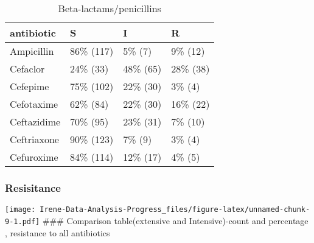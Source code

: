 \documentclass[
]{article}
\begin{document}
\begin{table}

\caption{\label{tab:unnamed-chunk-8}
Beta-lactams/penicillins}
\centering
\begin{tabular}[t]{l|l|l|l}
\hline
antibiotic & S & I & R\\
\hline
Ampicillin & 86\% (117) & 5\%  (7) & 9\% (12)\\
\hline
Cefaclor & 24\%  (33) & 48\% (65) & 28\% (38)\\
\hline
Cefepime & 75\% (102) & 22\% (30) & 3\%  (4)\\
\hline
Cefotaxime & 62\%  (84) & 22\% (30) & 16\% (22)\\
\hline
Ceftazidime & 70\%  (95) & 23\% (31) & 7\% (10)\\
\hline
Ceftriaxone & 90\% (123) & 7\%  (9) & 3\%  (4)\\
\hline
Cefuroxime & 84\% (114) & 12\% (17) & 4\%  (5)\\
\hline
\end{tabular}
\end{table}

\hypertarget{resisitance}{%
\subsubsection{Resisitance}\label{resisitance}}

\texttt{[image: Irene-Data-Analysis-Progress\_files/figure-latex/unnamed-chunk-9-1.pdf]}
\#\#\# Comparison table(extensive and Intensive)-count and percentage ,
resistance to all antibiotics
\end{document}
